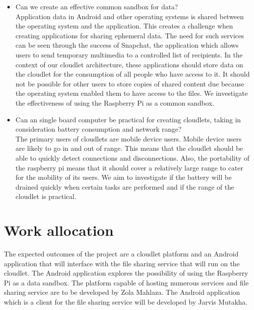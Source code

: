 \begin{itemize}
\item Can we create an effective common sandbox for data?\\

Application data in Android and other operating systems is shared between the operating system and the application. This creates a challenge when creating applications for sharing ephemeral data. The need for such services can be seen
through the success of Snapchat, the application which allows users to send temporary multimedia to a controlled list of recipients. In the context of our cloudlet architecture, these applications should store data on the cloudlet for the consumption of all people who have access to it. It should not be possible for other users to store copies of shared content due because the operating system enabled them to have access to the files. We investigate the effectiveness of using the Raspberry Pi as a common sandbox.

\item Can an single board computer be practical for creating cloudlets, taking in consideration battery consumption and network range?\\

The primary users of cloudlets are mobile device users. Mobile device users are likely to go in and out of range. This means that the cloudlet
should be able to quickly detect connections and disconnections. Also, the portability of the raspberry pi means that it should cover a relatively large range to cater for the mobility of its users. We aim to investigate if the battery will be drained quickly when certain tasks are performed and if the range of the cloudlet is practical.
\end{itemize}

\section{Work allocation}
The expected outcomes of the project are a cloudlet platform and an Android application that will interface with the file sharing service that will run on the cloudlet. The Android application explores the possibility of using the Raspberry Pi as a data sandbox. The platform capable of hosting numerous services and file sharing service are to be developed by Zola Mahlaza. The Android application which is a client for the file sharing service will be developed by Jarvis Mutakha.

